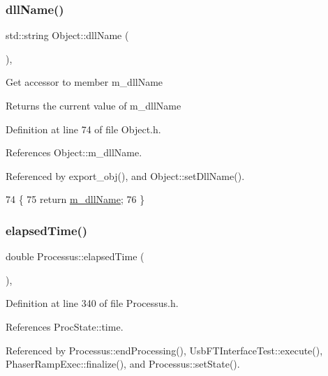 \subsubsection{\texorpdfstring{dll\+Name()}{dllName()}}
{\footnotesize\ttfamily std\+::string Object\+::dll\+Name (\begin{DoxyParamCaption}{ }\end{DoxyParamCaption})\hspace{0.3cm}{\ttfamily [inline]}, {\ttfamily [inherited]}}

Get accessor to member m\+\_\+dll\+Name \begin{DoxyReturn}{Returns}
the current value of m\+\_\+dll\+Name 
\end{DoxyReturn}


Definition at line 74 of file Object.\+h.



References Object\+::m\+\_\+dll\+Name.



Referenced by export\+\_\+obj(), and Object\+::set\+Dll\+Name().


\begin{DoxyCode}
74                        \{
75     \textcolor{keywordflow}{return} \hyperlink{classObject_a01afbeacebb8db6831559972ec362eb3}{m\_dllName};
76   \}  
\end{DoxyCode}
\mbox{\label{classProcessus_aecca96218c65bc805c988cd95447df55}} 
\subsubsection{\texorpdfstring{elapsed\+Time()}{elapsedTime()}\hspace{0.1cm}{\footnotesize\ttfamily [1/2]}}
{\footnotesize\ttfamily double Processus\+::elapsed\+Time (\begin{DoxyParamCaption}{ }\end{DoxyParamCaption})\hspace{0.3cm}{\ttfamily [inline]}, {\ttfamily [inherited]}}



Definition at line 340 of file Processus.\+h.



References Proc\+State\+::time.



Referenced by Processus\+::end\+Processing(), Usb\+F\+T\+Interface\+Test\+::execute(), Phaser\+Ramp\+Exec\+::finalize(), and Processus\+::set\+State().


